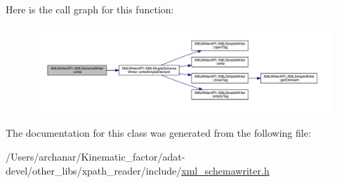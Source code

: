 Here is the call graph for this function\+:
\nopagebreak
\begin{figure}[H]
\begin{center}
\leavevmode
\includegraphics[width=350pt]{db/d34/classXMLWriterAPI_1_1XMLSchemaWriter_a0d6bf66ccbb217c4db704568f9c377fe_cgraph}
\end{center}
\end{figure}


The documentation for this class was generated from the following file\+:\begin{DoxyCompactItemize}
\item 
/\+Users/archanar/\+Kinematic\+\_\+factor/adat-\/devel/other\+\_\+libs/xpath\+\_\+reader/include/\mbox{\hyperlink{adat-devel_2other__libs_2xpath__reader_2include_2xml__schemawriter_8h}{xml\+\_\+schemawriter.\+h}}\end{DoxyCompactItemize}
